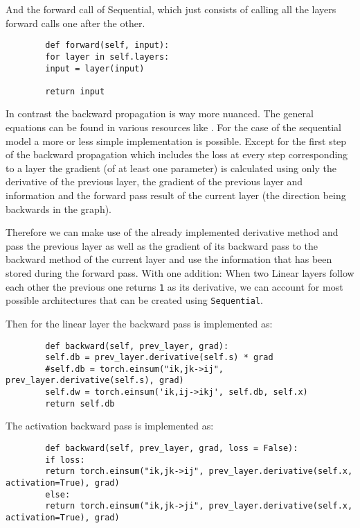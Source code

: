 \documentclass[11pt,english]{article}
\begin{document}
	And the forward call of Sequential, which just consists of calling all the layers forward calls one after the other.
	
	\begin{lstlisting}
		def forward(self, input):
		for layer in self.layers:
		input = layer(input)
		
		return input
	\end{lstlisting}

	In contrast the backward propagation is way more nuanced. The general equations can be found in various resources like \cite{Fleuret2022,Goodfellow-et-al-2016}. For the case of the sequential model a more or less simple implementation is possible. Except for the first step of the backward propagation which includes the loss at every step corresponding to a layer the gradient (of at least one parameter) is calculated using only the derivative of the previous layer, the gradient of the previous layer and information and the forward pass result of the current layer (the direction being backwards in the graph). 
	
	Therefore we can make use of the already implemented derivative method and pass the previous layer as well as the gradient of its backward pass to the backward method of the current layer and use the information that has been stored during the forward pass. With one addition: When two Linear layers follow each other the previous one returns \lstinline|1| as its derivative, we can account for most possible architectures that can be created using \lstinline|Sequential|.
	
	Then for the linear layer the backward pass is implemented as:
	
	\begin{lstlisting}
		def backward(self, prev_layer, grad):
		self.db = prev_layer.derivative(self.s) * grad
		#self.db = torch.einsum("ik,jk->ij", prev_layer.derivative(self.s), grad)
		self.dw = torch.einsum('ik,ij->ikj', self.db, self.x)
		return self.db
	\end{lstlisting} 
	
	The activation backward pass is implemented as:
	
	\begin{lstlisting}
		def backward(self, prev_layer, grad, loss = False):
		if loss:
		return torch.einsum("ik,jk->ij", prev_layer.derivative(self.x, activation=True), grad) 
		else:
		return torch.einsum("ik,jk->ji", prev_layer.derivative(self.x, activation=True), grad) 
	\end{lstlisting}
\end{document}
